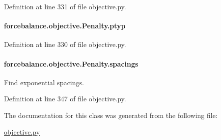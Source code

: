 Definition at line 331 of file objective.\-py.

\hypertarget{classforcebalance_1_1objective_1_1Penalty_aafed9613564329fc6a760aec26a43116}{
\paragraph[{ptyp}]{\setlength{\rightskip}{0pt plus 5cm}forcebalance.\-objective.\-Penalty.\-ptyp}}\label{classforcebalance_1_1objective_1_1Penalty_aafed9613564329fc6a760aec26a43116}


Definition at line 330 of file objective.\-py.

\hypertarget{classforcebalance_1_1objective_1_1Penalty_a9832c430eccb9edf404ba12ed2f54541}{
\paragraph[{spacings}]{\setlength{\rightskip}{0pt plus 5cm}forcebalance.\-objective.\-Penalty.\-spacings}}\label{classforcebalance_1_1objective_1_1Penalty_a9832c430eccb9edf404ba12ed2f54541}


Find exponential spacings. 



Definition at line 347 of file objective.\-py.



The documentation for this class was generated from the following file\-:\begin{DoxyCompactItemize}
\item 
\hyperlink{objective_8py}{objective.\-py}\end{DoxyCompactItemize}
